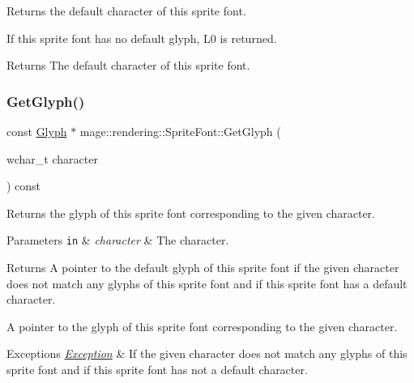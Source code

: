 Returns the default character of this sprite font.

If this sprite font has no default glyph, {\ttfamily L\textquotesingle{}0\textquotesingle{}} is returned.

\begin{DoxyReturn}{Returns}
The default character of this sprite font. 
\end{DoxyReturn}
\mbox{\label{classmage_1_1rendering_1_1_sprite_font_aa56b305252b14f6ecf51738fccb16e93}} 
\subsubsection{\texorpdfstring{Get\+Glyph()}{GetGlyph()}}
{\footnotesize\ttfamily const \mbox{\hyperlink{structmage_1_1rendering_1_1_glyph}{Glyph}} $\ast$ mage\+::rendering\+::\+Sprite\+Font\+::\+Get\+Glyph (\begin{DoxyParamCaption}\item[{wchar\+\_\+t}]{character }\end{DoxyParamCaption}) const}

Returns the glyph of this sprite font corresponding to the given character.


\begin{DoxyParams}[1]{Parameters}
\mbox{\tt in}  & {\em character} & The character. \\
\hline
\end{DoxyParams}
\begin{DoxyReturn}{Returns}
A pointer to the default glyph of this sprite font if the given character does not match any glyphs of this sprite font and if this sprite font has a default character. 

A pointer to the glyph of this sprite font corresponding to the given character. 
\end{DoxyReturn}

\begin{DoxyExceptions}{Exceptions}
{\em \mbox{\hyperlink{classmage_1_1_exception}{Exception}}} & If the given character does not match any glyphs of this sprite font and if this sprite font has not a default character. \\
\hline
\end{DoxyExceptions}
\mbox{\label{classmage_1_1rendering_1_1_sprite_font_af8a9229b449007440733cdd65d65b2f5}} 

